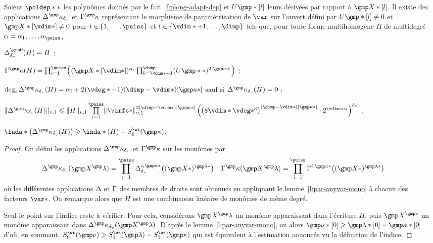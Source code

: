 \begin{lem} \label{l:par-var}
  Soient \( \poldep** \) les polynômes donnés par le
  fait~\ref{f:plong-adapt-dep} et \( \pden\mexp*[\indi] \) leurs dérivées par
  rapport à \( \vmp*[\indi] \).  Il existe des applications \(
    \pmnum^\dermp_\dv \) et \( \pmden^\dermp \) représentant le morphisme de
  paramétrisation de \( \var \) sur l'ouvert défini par \( \pden\mexp*[\indi]
    \neq 0 \) et \( \vmp*[\vdim*] \neq 0 \) pour \( \fct \in \set{1, \dots,
      \puiss} \) et \( \indi \in \set{\vdim*+1, \dots, \dimp} \) tels que,
  pour toute forme multihomogène \( H \) de multidegré \( \alpha = \alpha_1,
    \dots, \alpha_\puiss \),
  \begin{enumthm}
    \item \( \pmnum^{\gmp 0}_\dv (H) = H \) ;
    \item \(
        \pmden^\dermp(H)
        =
        \prod\fctrange \Bigl(
          (\vmp*[\vdim*])^{\alpha_\fct}
          \prod_{\ind=\vdim*+1}^{\dimp} (\pden\mexp**)^{2\lgr{\dermp*}}
        \Bigr)
      \) ;
    \item \(
        \deg_\fct \pmnum^\dermp_\dv (H)
        =
        \alpha_\fct
        + 2 (\vdeg* - 1) (\dimp - \vdim*) \lgr{\dermp*}
      \) sauf si \( \pmnum^\dermp_\dv (H) = 0 \) ;
    \item \(
        \nv1{ \pmnum^\dermp_\dv (H) }
        \le
        \nv1 H
        \prod\limits\fctrange
        \nv1{ \varfc* }^{ 2 (\dimp - \vdim*) \lgr{\dermp*} }
        \left(
          \bigl( 8 \vdim* \vdeg*^3 \bigr)^{(\dimp - \vdim*) \lgr{\dermp*}}
          \cdot 2^{ \vdim* \alpha_\fct }
        \right)^\dv
      \) ;
    \item \( \inda* \bigl( \pmnum^\dermp_\dv (H) \bigr)
        \ge \inda*(H) - \wtsum*(\dermp) \).
  \end{enumthm}
\end{lem}

\begin{proof}
  On défini les applications \( \pmnum^\dermp_\dv \) et \( \pmden^\dermp \)
  sur les monômes par
  \begin{align}
    \pmnum^\dermp_\dv (\vmp^\imp)
    & =
    \prod\fctrange \pmnum^{\fct, \dermp*}_\dv \bigl( (\vmp*)^{\imp*} \bigr)
    &
    \pmden^\dermp (\vmp^\imp)
    & =
    \prod\fctrange \pmden^{\fct, \dermp*} \bigl( (\vmp*)^{\imp*} \bigr)
  \end{align}
  où les différentes applications \( \Delta \) et \( \Gamma \) des membres de
  droite sont obtenues en appliquant le lemme~\ref{l:par-anyvar-mono} à
  chacun des facteurs \( \var* \). On remarque alors que \( H \) est une
  combinaison linéaire de monômes de même degré.

  Seul le point sur l'indice reste à vérifier. Pour cela, considérons \(
    \vmp^\imp \) un monôme apparaissant dans l'écriture \( H \), puis \(
    \vmp^{\gmp\nu} \) un monôme apparaissant dans \( \pmnum^\dermp_\dv(
    \vmp^\imp ) \). D'après le lemme~\ref{l:par-anyvar-mono}, on alors \(
    \gmp\nu*[0] \ge \imp*[0] - \dermp*[0] \) d'où, en sommant, \(
    \wtsum*(\gmp\nu) \ge \wtsum*(\imp) - \wtsum*(\dermp) \) qui est équivalent
  à l'estimation annoncée vu la définition de l'indice.
\end{proof}

